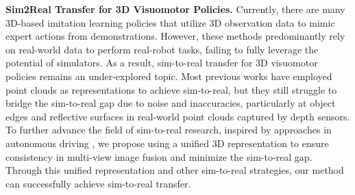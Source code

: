 \textbf{Sim2Real Transfer for 3D Visuomotor Policies.} Currently, there are many 3D-based imitation learning policies \cite{shridhar2023perceiver,goyal2023rvt,gervet2023act3d,ze20243d,ke20243d,xian2023chaineddiffuser,liu2024voxact} that utilize 3D observation data to mimic expert actions from demonstrations. However, these methods predominantly rely on real-world data to perform real-robot tasks, failing to fully leverage the potential of simulators. As a result, sim-to-real transfer for 3D visuomotor policies remains an under-explored topic. Most previous works \cite{lyu2024scissorbot,xie2023part,qin2023dexpoint,wang2025mobileh2r} have employed point clouds as representations to achieve sim-to-real, but they still struggle to bridge the sim-to-real gap due to noise and inaccuracies, particularly at object edges and reflective surfaces in real-world point clouds captured by depth sensors. To further advance the field of sim-to-real research, inspired by approaches in autonomous driving \cite{wang2024panoocc,cao2022monoscene,wei2023surroundocc}, we propose using a unified 3D representation to ensure consistency in multi-view image fusion and minimize the sim-to-real gap. Through this unified representation and other sim-to-real strategies, our method can successfully achieve sim-to-real transfer.
